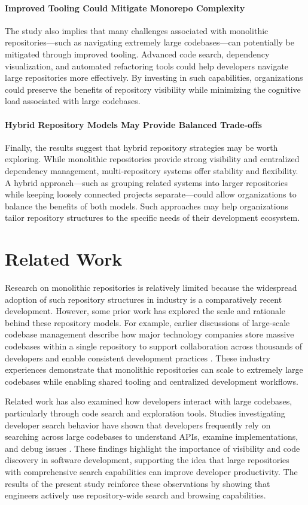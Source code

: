 \paragraph{Improved Tooling Could Mitigate Monorepo Complexity}
The study also implies that many challenges associated with monolithic repositories—such as navigating extremely large codebases—can potentially be mitigated through improved tooling. Advanced code search, dependency visualization, and automated refactoring tools could help developers navigate large repositories more effectively. By investing in such capabilities, organizations could preserve the benefits of repository visibility while minimizing the cognitive load associated with large codebases.

\paragraph{Hybrid Repository Models May Provide Balanced Trade-offs}
Finally, the results suggest that hybrid repository strategies may be worth exploring. While monolithic repositories provide strong visibility and centralized dependency management, multi-repository systems offer stability and flexibility. A hybrid approach—such as grouping related systems into larger repositories while keeping loosely connected projects separate—could allow organizations to balance the benefits of both models. Such approaches may help organizations tailor repository structures to the specific needs of their development ecosystem.

\section{Related Work}
Research on monolithic repositories is relatively limited because the widespread adoption of such repository structures in industry is a comparatively recent development. However, some prior work has explored the scale and rationale behind these repository models. For example, earlier discussions of large-scale codebase management describe how major technology companies store massive codebases within a single repository to support collaboration across thousands of developers and enable consistent development practices \cite{potvin2016google}. These industry experiences demonstrate that monolithic repositories can scale to extremely large codebases while enabling shared tooling and centralized development workflows.

Related work has also examined how developers interact with large codebases, particularly through code search and exploration tools. Studies investigating developer search behavior have shown that developers frequently rely on searching across large codebases to understand APIs, examine implementations, and debug issues \cite{sadowski2015developers}. These findings highlight the importance of visibility and code discovery in software development, supporting the idea that large repositories with comprehensive search capabilities can improve developer productivity. The results of the present study reinforce these observations by showing that engineers actively use repository-wide search and browsing capabilities.

